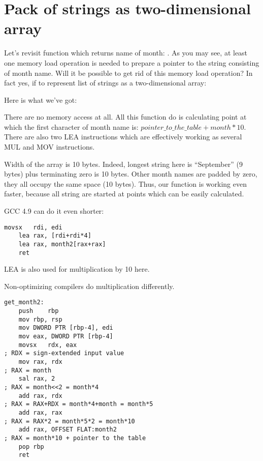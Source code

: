\ifdefined\RUSSIAN
\else
\section{Pack of strings as two-dimensional array}

Let's revisit function which returns name of month: .
As you may see, at least one memory load operation is needed to prepare a pointer to the string
consisting of month name.
Will it be possible to get rid of this memory load operation?
In fact yes, if to represent list of strings as a two-dimensional array:



Here is what we've got:



There are no memory access at all. 
All this function do is calculating point at which the first character of month name is: 
$pointer\_to\_the\_table + month * 10$.
There are also two LEA instructions which are effectively working as several MUL and MOV instructions.

Width of the array is 10 bytes. 
Indeed, longest string here is ``September'' (9 bytes) plus terminating zero is 10 bytes.
Other month names are padded by zero, they all occupy the same space (10 bytes).
Thus, our function is working even faster, because all string are started at points which can be easily
calculated.

GCC 4.9 can do it even shorter:

\begin{lstlisting}[caption=\Optimizing GCC 4.9 x64]
	movsx	rdi, edi
	lea	rax, [rdi+rdi*4]
	lea	rax, month2[rax+rax]
	ret
\end{lstlisting}

LEA is also used for multiplication by 10 here.

Non-optimizing compilers do multiplication differently.

\begin{lstlisting}[caption=\NonOptimizing GCC 4.9 x64]
get_month2:
	push	rbp
	mov	rbp, rsp
	mov	DWORD PTR [rbp-4], edi
	mov	eax, DWORD PTR [rbp-4]
	movsx	rdx, eax
; RDX = sign-extended input value
	mov	rax, rdx
; RAX = month
	sal	rax, 2
; RAX = month<<2 = month*4
	add	rax, rdx
; RAX = RAX+RDX = month*4+month = month*5
	add	rax, rax
; RAX = RAX*2 = month*5*2 = month*10
	add	rax, OFFSET FLAT:month2
; RAX = month*10 + pointer to the table
	pop	rbp
	ret
\end{lstlisting}

